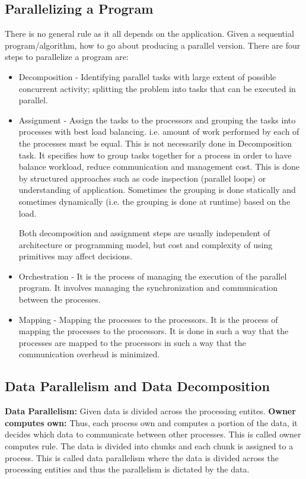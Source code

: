 \documentclass[12pt]{book}
\begin{document}
\subsection{Parallelizing a Program}
There is no general rule as it all depends on the application. Given a sequential program/algorithm, how to go about producing a parallel version. There are four steps to parallelize a program are:
\begin{itemize}
    \item Decomposition - Identifying parallel tasks with large extent of possible concurrent activity; splitting the problem into tasks that can be executed in parallel.
    \item Assignment - Assign the tasks to the processors and grouping the tasks into processes with best load balancing. i.e. amount of work performed by each of the processes must be equal.
    This is not necessarily done in Decomposition task. It specifies how to group tasks together for a process in order to have balance workload, reduce communication and management cost.
    This is done by structured approaches such as code inspection (parallel loops) or understanding of application. Sometimes the grouping is done statically and sometimes dynamically (i.e. the grouping is done at runtime) based on the load.

    Both decomposition and assignment steps are usually independent of architecture or programming model, but cost and complexity of using primitives may affect decisions.
    \item Orchestration - It is the process of managing the execution of the parallel program. It involves managing the synchronization and communication between the processes. 
    \item Mapping - Mapping the processes to the processors. It is the process of mapping the processes to the processors. It is done in such a way that the processes are mapped to the processors in such a way that the communication overhead is minimized.
\end{itemize}
\subsection{Data Parallelism and Data Decomposition}
\textbf{Data Parallelism: }Given data is divided across the processing entites. \textbf{Owner computes own:} Thus, each process own and computes a portion of the data, it decides which data to communicate between other processes.
This is called owner computes rule. The data is divided into chunks and each chunk is assigned to a process. This is called data parallelism where the data is divided across the processing entities and thus the parallelism is dictated by the data. 
\end{document}
